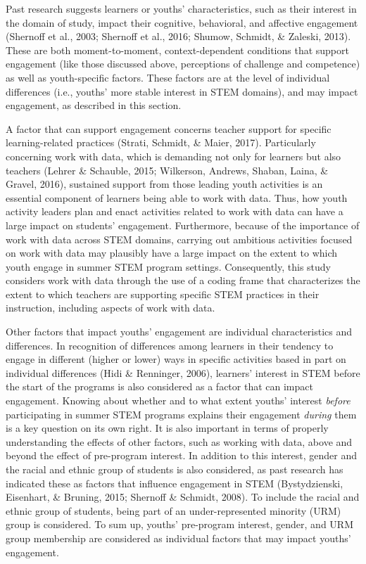 \documentclass[]{book}
\theoremstyle{definition}
\theoremstyle{definition}
\theoremstyle{definition}
\theoremstyle{remark}
\begin{document}
Past research suggests learners or youths' characteristics, such as
their interest in the domain of study, impact their cognitive,
behavioral, and affective engagement (Shernoff et al., 2003; Shernoff et
al., 2016; Shumow, Schmidt, \& Zaleski, 2013). These are both
moment-to-moment, context-dependent conditions that support engagement
(like those discussed above, perceptions of challenge and competence) as
well as youth-specific factors. These factors are at the level of
individual differences (i.e., youths' more stable interest in STEM
domains), and may impact engagement, as described in this section.

A factor that can support engagement concerns teacher support for
specific learning-related practices (Strati, Schmidt, \& Maier, 2017).
Particularly concerning work with data, which is demanding not only for
learners but also teachers (Lehrer \& Schauble, 2015; Wilkerson,
Andrews, Shaban, Laina, \& Gravel, 2016), sustained support from those
leading youth activities is an essential component of learners being
able to work with data. Thus, how youth activity leaders plan and enact
activities related to work with data can have a large impact on
students' engagement. Furthermore, because of the importance of work
with data across STEM domains, carrying out ambitious activities focused
on work with data may plausibly have a large impact on the extent to
which youth engage in summer STEM program settings. Consequently, this
study considers work with data through the use of a coding frame that
characterizes the extent to which teachers are supporting specific STEM
practices in their instruction, including aspects of work with data.

Other factors that impact youths' engagement are individual
characteristics and differences. In recognition of differences among
learners in their tendency to engage in different (higher or lower) ways
in specific activities based in part on individual differences (Hidi \&
Renninger, 2006), learners' interest in STEM before the start of the
programs is also considered as a factor that can impact engagement.
Knowing about whether and to what extent youths' interest \emph{before}
participating in summer STEM programs explains their engagement
\emph{during} them is a key question on its own right. It is also
important in terms of properly understanding the effects of other
factors, such as working with data, above and beyond the effect of
pre-program interest. In addition to this interest, gender and the
racial and ethnic group of students is also considered, as past research
has indicated these as factors that influence engagement in STEM
(Bystydzienski, Eisenhart, \& Bruning, 2015; Shernoff \& Schmidt, 2008).
To include the racial and ethnic group of students, being part of an
under-represented minority (URM) group is considered. To sum up, youths'
pre-program interest, gender, and URM group membership are considered as
individual factors that may impact youths' engagement.
\end{document}
